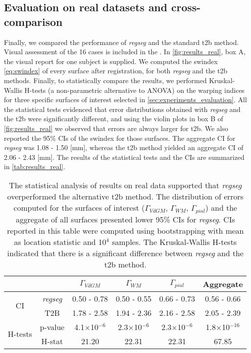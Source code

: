 \subsection{Evaluation on real datasets and cross-comparison}\label{sec:results_hcp}
%
Finally, we compared the performance of \emph{regseg} and the standard \gls*{t2b}
  method.
Visual assessment of the 16 cases is included in the .
In \autoref{fig:results_real}, box A, the visual report for one subject is supplied.
We computed the \gls*{swindex} \eqref{eq:swindex} of every surface after registration,
  for both \emph{regseg} and the \gls*{t2b} methods.
Finally, to statistically compare the results, we performed Kruskal-Wallis H-tests
  (a non-parametric alternative to ANOVA) on the warping indices for three specific 
  surfaces of interest selected in \autoref{sec:experiments_evaluation}.
All the statistical tests evidenced that error distributions obtained with \emph{regseg} and
  the \gls*{t2b} were significantly different, and using the violin plots in box B of
  \autoref{fig:results_real} we observed that errors are always larger for \gls*{t2b}.
We also reported the 95\% CIs of the \gls*{swindex} for those surfaces.
The aggregate CI for \emph{regseg} was 1.08 - 1.50 [mm], whereas the \gls*{t2b} method
  yielded an aggregate CI of 2.06 - 2.43 [mm].
The results of the statistical tests and the CIs are summarized in \autoref{tab:results_real}.



\begin{table}
		\centering
		\footnotesize
		\tabcolsep=0.08cm
    \begin{tabular}{cccccc}
    & & $\Gamma_{VdGM}$  & $\Gamma_{WM}$ & $\Gamma_{pial}$ & Aggregate \\
    \hline
    \multirow{2}{*}{CI}
       & \emph{regseg}        & 0.50 - 0.78 & 0.50 - 0.55 & 0.66 - 0.73 & 0.56 - 0.66 \\
       & T2B                  & 1.78 - 2.58 & 1.94 - 2.36 & 2.16 - 2.58 & 2.05 - 2.39 \\
    \hline
    \multirow{2}{*}{H-tests}
       & p-value  & 4.1$\times$10$^{-6}$& 2.3$\times$10$^{-6}$& 2.3$\times$10$^{-6}$ & 1.8$\times$10$^{-16}$ \\
       & H-stat   & 21.20               & 22.31               & 22.31                & 67.85              \\
    \hline
    \end{tabular}
    \caption{The statistical analysis of results on real data supported that \emph{regseg} overperformed
    the alternative \acrfull{t2b} method.
    The distribution of errors computed for the surfaces of interest ($\Gamma_{VdGM}$, $\Gamma_{WM}$, $\Gamma_{pial}$)
      and the aggregate of all surfaces presented lower 95\% CIs for \emph{regseg}.
    CIs reported in this table were computed using bootstrapping with mean as location statistic and 10$^4$ samples.
    The Kruskal-Wallis H-tests indicated that there is a significant difference between \emph{regseg} and
      the \gls*{t2b} method.
    }\label{tab:results_real}
\end{table}

